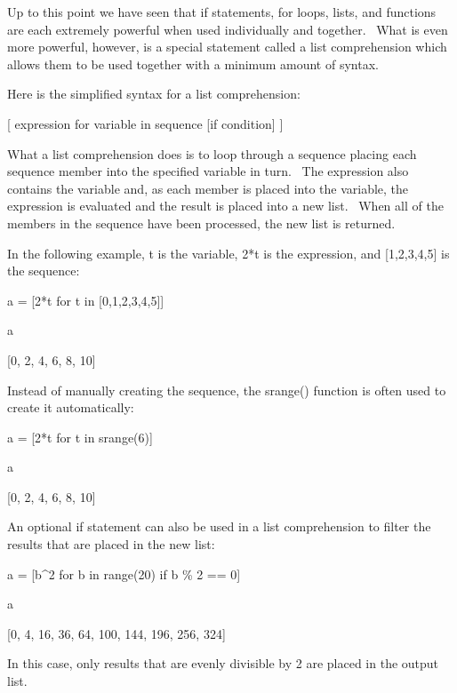 \documentclass[12pt,twoside]{book}
\begin{document}
Up to this point we have seen that if statements, for loops, lists, and functions are each extremely powerful when used individually and together. \ What is even more powerful, however, is a special statement called a list comprehension which allows them to be used together with a minimum amount of syntax. 

\bigskip

Here is the simplified syntax for a list comprehension:


\bigskip

[ expression for variable in sequence [if condition] ]


\bigskip

What a list comprehension does is to loop through a sequence placing each sequence member into the specified variable in turn. \ The expression also contains the variable and, as each member is placed into the variable, the expression is evaluated and the result is placed into a new list. \ When all of the members in the sequence have been processed, the new list is returned. 


In the following example, t is the variable, 2*t is the expression, and [1,2,3,4,5] is the sequence: 

\bigskip

a = [2*t for t in [0,1,2,3,4,5]]

a

{\textbar}

[0, 2, 4, 6, 8, 10]

Instead of manually creating the sequence, the srange() function is often used to create it automatically: 

\bigskip

a = [2*t for t in srange(6)]

a

{\textbar}

[0, 2, 4, 6, 8, 10]

An optional if statement can also be used in a list comprehension to filter the results that are placed in the new list: 

\bigskip

a = [b\^{}2 for b in range(20) if b \% 2 == 0]

a

{\textbar}

[0, 4, 16, 36, 64, 100, 144, 196, 256, 324]

In this case, only results that are evenly divisible by 2 are placed in the output list. 

\bigskip
\end{document}
